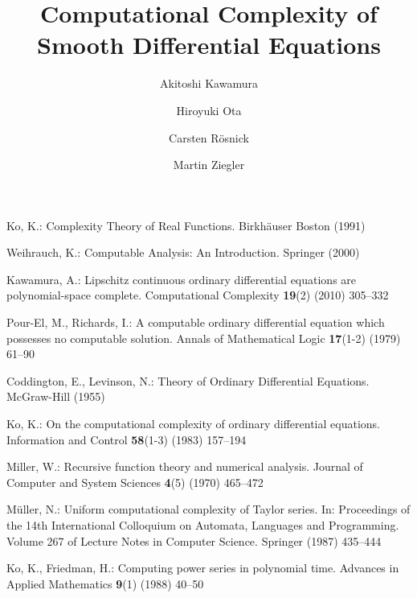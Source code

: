 \documentclass[envcountsame]{llncs}
\title{Computational Complexity of\\Smooth Differential Equations}
\author{%
Akitoshi Kawamura\inst{1}
\and
Hiroyuki Ota\inst{1}
\and
Carsten R\"osnick\inst{2}
\and
Martin Ziegler\inst{2}
}
\institute{%
University of Tokyo,  Tokyo, Japan\\
\and
Technische Universit\"at Darmstadt, Darmstadt, Germany}
\begin{document}
\maketitle








% 
% 
% 

\begin{thebibliography}{10}

Ko, K.:
\newblock Complexity Theory of Real Functions.
\newblock Birkh{\"a}user Boston (1991)

Weihrauch, K.:
\newblock Computable Analysis: An Introduction.
\newblock Springer (2000)

Kawamura, A.:
\newblock Lipschitz continuous ordinary differential equations are
  polynomial-space complete.
\newblock Computational Complexity \textbf{19}(2) (2010)  305--332

Pour-El, M., Richards, I.:
\newblock A computable ordinary differential equation which possesses no
  computable solution.
\newblock Annals of Mathematical Logic \textbf{17}(1-2) (1979)  61--90

Coddington, E., Levinson, N.:
\newblock Theory of Ordinary Differential Equations.
\newblock McGraw-Hill (1955)

Ko, K.:
\newblock On the computational complexity of ordinary differential equations.
\newblock Information and Control \textbf{58}(1-3) (1983)  157--194

Miller, W.:
\newblock Recursive function theory and numerical analysis.
\newblock Journal of Computer and System Sciences \textbf{4}(5) (1970)
  465--472

M{\"u}ller, N.:
\newblock Uniform computational complexity of {T}aylor series.
\newblock In: Proceedings of the 
  14th International Colloquium on Automata, Languages and Programming. 
\newblock Volume 267 of Lecture Notes in Computer Science. 
  Springer (1987)  435--444

Ko, K., Friedman, H.:
\newblock Computing power series in polynomial time.
\newblock Advances in Applied Mathematics \textbf{9}(1) (1988)  40--50


\end{thebibliography}
\end{document}
